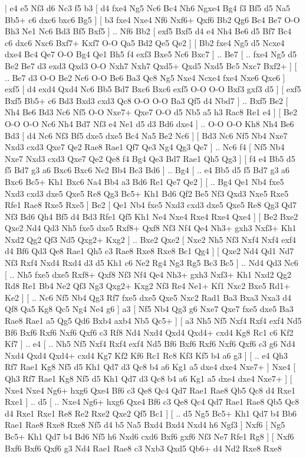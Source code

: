 \makegametitle 
|   e4   e5    Nf3   d6    Nc3   f5    b3 [  d4 fxe4  Ng5 Nc6  Bc4 Nh6  Ngxe4 Bg4  f3 Bf5  d5 Na5  Bb5+ c6  dxc6 bxc6  Bg5   ]  [  b3 fxe4  Nxe4 Nf6  Nxf6+ Qxf6  Bb2 Qg6  Bc4 Be7  O-O Bh3  Ne1 Nc6  Bd3 Bf5  Bxf5   ] .. Nf6    Bb2 [  exf5 Bxf5  d4 e4  Nh4 Be6  d5 Bf7  Bc4 c6  dxc6 Nxc6  Bxf7+ Kxf7  O-O Qa5  Bd2 Qe5  Qe2   ]  [  Bb2 fxe4  Ng5 d5  Ncxe4 dxe4  Bc4 Qe7  O-O Bg4  Qe1 Bh5  f4 exf3  Bxe5 Nc6  Bxc7   ] .. Be7 [ .. fxe4  Ng5 d5  Be2 Be7  d3 exd3  Qxd3 O-O  Nxh7 Nxh7  Qxd5+ Qxd5  Nxd5 Bc5  Nxc7 Bxf2+   ]  [ .. Be7  d3 O-O  Be2 Nc6  O-O Be6  Ba3 Qc8  Ng5 Nxe4  Ncxe4 fxe4  Nxe6 Qxe6   ]  exf5 [  d4 exd4  Qxd4 Nc6  Bb5 Bd7  Bxc6 Bxc6  exf5 O-O  O-O Bxf3  gxf3 d5   ]  [  exf5 Bxf5  Bb5+ c6  Bd3 Bxd3  cxd3 Qc8  O-O O-O  Ba3 Qf5  d4 Nbd7   ] .. Bxf5    Be2 [  Nh4 Be6  Bd3 Nc6  Nf5 O-O  Nxe7+ Qxe7  O-O d5  Nb5 a5  h3 Rac8  Re1 e4   ]  [  Be2 O-O  O-O Nc6  Nh4 Bd7  Nf3 e4  Ne1 d5  d3 Bd6  dxe4   ] .. O-O    O-O   Kh8    Nh4   Be6    Bd3 [  d4 Nc6  Nf3 Bf5  dxe5 dxe5  Bc4 Na5  Be2 Nc6   ]  [  Bd3 Nc6  Nf5 Nb4  Nxe7 Nxd3  cxd3 Qxe7  Qe2 Rae8  Rae1 Qf7  Qe3 Ng4  Qg3 Qe7   ] .. Nc6    f4 [  Nf5 Nb4  Nxe7 Nxd3  cxd3 Qxe7  Qe2 Qe8  f4 Bg4  Qe3 Bd7  Rae1 Qh5  Qg3   ]  [  f4 e4  Bb5 d5  f5 Bd7  g3 a6  Bxc6 Bxc6  Ne2 Bb4  Bc3 Bd6   ] .. Bg4 [ .. e4  Bb5 d5  f5 Bd7  g3 a6  Bxc6 Bc5+  Kh1 Bxc6  Na4 Bb4  a3 Bd6  Re1 Qe7  Qe2   ]  [ .. Bg4  Qe1 Nb4  fxe5 Nxd3  cxd3 dxe5  Qxe5 Re8  Qg3 Bc5+  Kh1 Bd6  Qf2 Be5  Nf3 Qxd3  Nxe5 Rxe5  Rfe1 Rae8  Rxe5 Rxe5   ]  Be2    [  Qe1 Nb4  fxe5 Nxd3  cxd3 dxe5  Qxe5 Re8  Qg3 Qd7  Nf3 Bd6  Qh4 Bf5  d4 Bd3  Rfe1 Qf5  Kh1 Ne4  Nxe4 Rxe4  Rxe4 Qxe4   ]  [  Be2 Bxe2  Qxe2 Nd4  Qd3 Nh5  fxe5 dxe5  Rxf8+ Qxf8  Nf3 Nf4  Qe4 Nh3+  gxh3 Nxf3+  Kh1 Nxd2  Qg2 Qf3  Nd5 Qxg2+  Kxg2   ] .. Bxe2    Qxe2    [  Nxe2 Nh5  Nf3 Nxf4  Nxf4 exf4  d4 Bf6  Qd3 Qe8  Rae1 Qh5  c3 Rae8  Rxe8 Rxe8  Bc1 Qg4   ]  [  Qxe2 Nd4  Qd1 Nd7  Nf3 Rxf4  Nxd4 Rxd4  d3 d5  Kh1 c6  Ne2 Rg4  Ng3 Rg5  Bc3 Bc5   ] .. Nd4    Qd3   Nc6 [ .. Nh5  fxe5 dxe5  Rxf8+ Qxf8  Nf3 Nf4  Qe4 Nh3+  gxh3 Nxf3+  Kh1 Nxd2  Qg2 Rd8  Re1 Bb4  Ne2 Qf3  Ng3 Qxg2+  Kxg2 Nf3  Re4 Ne1+  Kf1 Nxc2  Bxe5 Rd1+  Ke2   ]  [ .. Nc6  Nf5 Nb4  Qg3 Rf7  fxe5 dxe5  Qxe5 Nxc2  Rad1 Ba3  Bxa3 Nxa3  d4 Qf8  Qa5 Kg8  Qc5 Ng4  Ne4 g6   ]  a3 [  Nf5 Nb4  Qg3 g6  Nxe7 Qxe7  fxe5 dxe5  Ba3 Rae8  Rae1 a5  Qg5 Qd6  Bxb4 axb4  Nb5 Qc5+   ]  [  a3 Nh5  Nf5 Nxf4  Rxf4 exf4  Nd5 Bf6  Bxf6 Rxf6  Nxf6 Qxf6  c3 Rf8  Nd4 Nxd4  Qxd4 Qxd4+  cxd4 Kg8  Rc1 c6  Kf2 Kf7   ] .. e4 [ .. Nh5  Nf5 Nxf4  Rxf4 exf4  Nd5 Bf6  Bxf6 Rxf6  Nxf6 Qxf6  c3 g6  Nd4 Nxd4  Qxd4 Qxd4+  cxd4 Kg7  Kf2 Kf6  Rc1 Rc8  Kf3 Kf5  b4 a6  g3   ]  [ .. e4  Qh3 Rf7  Rae1 Kg8  Nf5 d5  Kh1 Qd7  d3 Qc8  b4 a6  Kg1 a5  dxe4 dxe4  Nxe7+   ]  Nxe4 [  Qh3 Rf7  Rae1 Kg8  Nf5 d5  Kh1 Qd7  d3 Qc8  b4 a6  Kg1 a5  dxe4 dxe4  Nxe7+   ]  [  Nxe4 Nxe4  Ng6+ hxg6  Qxe4 Bf6  c3 Qe8  Qc4 Qd7  Rae1 Rae8  Qb5 Qc8  d4 Rxe1  Rxe1   ] .. d5 [ .. Nxe4  Ng6+ hxg6  Qxe4 Bf6  c3 Qe8  Qc4 Qd7  Rae1 Rae8  Qb5 Qc8  d4 Rxe1  Rxe1 Re8  Re2 Rxe2  Qxe2 Qf5  Bc1   ]  [ .. d5  Ng5 Bc5+  Kh1 Qd7  b4 Bb6  Rae1 Rae8  Rxe8 Rxe8  Nf5 d4  b5 Na5  Bxd4 Bxd4  Nxd4 h6  Ngf3   ]  Nxf6 [  Ng5 Bc5+  Kh1 Qd7  b4 Bd6  Nf5 h6  Nxd6 cxd6  Bxf6 gxf6  Nf3 Ne7  Rfe1 Rg8   ]  [  Nxf6 Bxf6  Bxf6 Qxf6  g3 Nd4  Rae1 Rae8  c3 Nxb3  Qxd5 Qb6+  d4 Nd2  Rxe8 Rxe8  